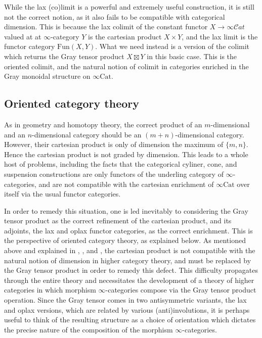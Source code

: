 \documentclass[10pt,oneside]{article}
\numberwithin{equation}{section} %
\numberwithin{figure}{section} %
\theoremstyle{plain}
\theoremstyle{definition}
\newcommand{\Cat}{\mathrm{Cat}}
\newcommand{\Fun}{\mathrm{Fun}}
\newcommand{\scat}{\mathcal{C}\mathit{at}}
\begin{document}
While the lax (co)limit is a powerful and extremely useful construction, it is still not the correct notion, as it also fails to be compatible with categorical dimension.
This is because the lax colimit of the constant functor $X\to\infty\scat$ valued at at $\infty$-category $Y$ is the cartesian product $X\times Y$, and the lax limit is the functor category $\Fun(X,Y)$.
What we need instead is a version of the colimit which returns the Gray tensor product $X\boxtimes Y$ in this basic case.
This is the oriented colimit, and the natural notion of colimit in categories enriched in the Gray monoidal structure on $\infty\Cat$.


\subsection{Oriented category theory}
As in geometry and homotopy theory, the correct product of an $m$-dimensional and an $n$-dimensional category should be an $(m+n)$-dimensional category.
However, their cartesian product is only of dimension the maximum of $\{m,n\}$.
Hence the cartesian product is not graded by dimension.
This leads to a whole host of problems, including the facts that the categorical cyliner, cone, and suspension constructions are only functors of the underling category of $\infty$-categories, and are not compatible with the cartesian enrichment of $\infty\Cat$ over itself via the usual functor categories.

In order to remedy this situation, one is led inevitably to considering the Gray tensor product as the correct refinement of the cartesian product, and its adjoints, the lax and oplax functor categories, as the correct enrichment.
This is the perspective of oriented category theory, as explained below.
As mentioned above and explained in \cite{GepnerHeine2026}, \cite{gepner2026homotopy}, and \cite{gepner2026fibrations}, the cartesian product is not compatible with the natural notion of dimension in higher category theory, and must be replaced by the Gray tensor product in order to remedy this defect.
This difficulty propagates through the entire theory and necessitates the development of a theory of higher categories in which morphism $\infty$-categories compose via the Gray tensor product operation.
Since the Gray tensor comes in two antisymmetric variants, the lax and oplax versions, which are related by various (anti)involutions, it is perhaps useful to think of the resulting structure as a choice of orientation which dictates the precise nature of the composition of the morphism $\infty$-categories.
\end{document}
